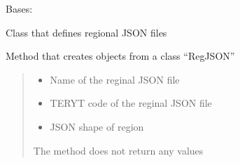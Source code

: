 \documentclass[letterpaper,10pt,english]{sphinxmanual}
\begin{document}

\begin{fulllineitems}
\label{\detokenize{db_classes:db_classes.RegJSON}}
\pysigstartsignatures
{}
\pysigstopsignatures
\sphinxAtStartPar
Bases: 

\sphinxAtStartPar
Class that defines regional JSON files

\begin{fulllineitems}
\label{\detokenize{db_classes:db_classes.RegJSON.__init__}}
\pysigstartsignatures
{}
\pysigstopsignatures
\sphinxAtStartPar
Method that creates objects from a class “RegJSON”
\begin{quote}\begin{description}
\begin{itemize}
\item {} 
\sphinxAtStartPar
{} \textendash{} Name of the reginal JSON file

\item {} 
\sphinxAtStartPar
{} \textendash{} TERYT code of the reginal JSON file

\item {} 
\sphinxAtStartPar
{} \textendash{} JSON shape of region

\end{itemize}

\sphinxAtStartPar
The method does not return any values

\end{description}\end{quote}

\end{fulllineitems}



\end{fulllineitems}
\end{document}
